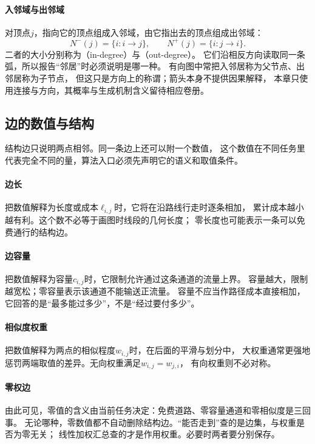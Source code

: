 \paragraph{入邻域与出邻域}
对顶点$j$，指向它的顶点组成入邻域，由它指出去的顶点组成出邻域：
\[
  N^-(j)=\{i:i\to j\},\qquad N^+(j)=\{i:j\to i\}.
\]
二者的大小分别称为（in-degree）与（out-degree）。
它们沿相反方向读取同一条弧，所以报告“邻居”时必须说明是哪一种。
有向图中常把入邻居称为父节点、出邻居称为子节点，
但这只是方向上的称谓；箭头本身不提供因果解释，
本章只使用连接与方向，其概率与生成机制含义留待相应卷册。

\subsection{边的数值与结构}

结构边只说明两点相邻。同一条边上还可以附一个数值，
这个数值在不同任务里代表完全不同的量，算法入口必须先声明它的语义和取值条件。

\paragraph{边长}
把数值解释为长度或成本$\ell_{i,j}$时，它将在沿路线行走时逐条相加，
累计成本越小越有利。这个数不必等于画图时线段的几何长度；
零长度也可能表示一条可以免费通行的结构边。

\paragraph{边容量}
把数值解释为容量$c_{i,j}$时，它限制允许通过这条通道的流量上界。
容量越大，限制越宽松；零容量表示该通道不能输送正流量。
容量不应当作路径成本直接相加，它回答的是“最多能过多少”，不是“经过要付多少”。

\paragraph{相似度权重}
把数值解释为两点的相似程度$w_{i,j}$时，在后面的平滑与划分中，
大权重通常更强地惩罚两端取值的差异。无向权重满足$w_{i,j}=w_{j,i}$，
有向权重则不必对称。

\paragraph{零权边}
由此可见，零值的含义由当前任务决定：免费道路、零容量通道和零相似度是三回事。
无论哪种，零数值都不自动删除结构边。“能否走到”查的是边集，与权重是否为零无关；
线性加权汇总查的才是作用权重。必要时两者要分别保存。

